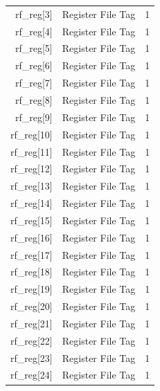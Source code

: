 \begin{table}
\begin{tabular}{rlc}
        rf\_reg[3]                      & Register File Tag            & 1    \\
        rf\_reg[4]                      & Register File Tag            & 1    \\
        rf\_reg[5]                      & Register File Tag            & 1    \\
        rf\_reg[6]                      & Register File Tag            & 1    \\
        rf\_reg[7]                      & Register File Tag            & 1    \\
        rf\_reg[8]                      & Register File Tag            & 1    \\
        rf\_reg[9]                      & Register File Tag            & 1    \\
        rf\_reg[10]                     & Register File Tag            & 1    \\
        rf\_reg[11]                     & Register File Tag            & 1    \\
        rf\_reg[12]                     & Register File Tag            & 1    \\
        rf\_reg[13]                     & Register File Tag            & 1    \\
        rf\_reg[14]                     & Register File Tag            & 1    \\
        rf\_reg[15]                     & Register File Tag            & 1    \\
        rf\_reg[16]                     & Register File Tag            & 1    \\
        rf\_reg[17]                     & Register File Tag            & 1    \\
        rf\_reg[18]                     & Register File Tag            & 1    \\
        rf\_reg[19]                     & Register File Tag            & 1    \\
        rf\_reg[20]                     & Register File Tag            & 1    \\
        rf\_reg[21]                     & Register File Tag            & 1    \\
        rf\_reg[22]                     & Register File Tag            & 1    \\
        rf\_reg[23]                     & Register File Tag            & 1    \\
        rf\_reg[24]                     & Register File Tag            & 1    \\

\end{tabular}
\end{table}

